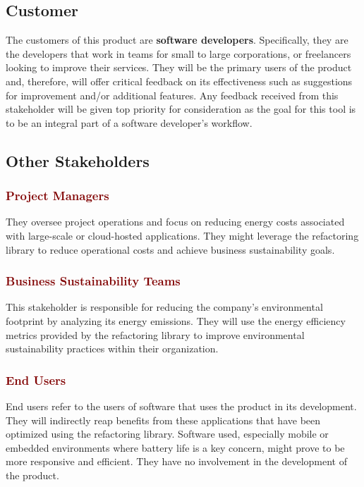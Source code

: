 \documentclass[12pt]{article}
\begin{document}
\subsection{Customer}
The customers of this product are \textbf{software developers}.
Specifically, they are the developers that work in teams for small to
large corporations, or freelancers looking to improve their services.
They will be the primary users of the product and, therefore, will
offer critical feedback on its effectiveness such as suggestions for
improvement and/or additional features. Any feedback received from
this stakeholder will be given top priority for consideration as the
goal for this tool is to be an integral part of a software developer's workflow.

\subsection{Other Stakeholders}
\subsubsection*{\textcolor{Maroon}{Project Managers}}
They oversee project operations and focus on reducing energy costs
associated with large-scale or cloud-hosted applications. They might
leverage the refactoring library to reduce operational costs and
achieve business sustainability goals.

\subsubsection*{\textcolor{Maroon}{Business Sustainability Teams}}
This stakeholder is responsible for reducing the company's
environmental footprint by analyzing its energy emissions. They will
use the energy efficiency metrics provided by the refactoring library
to improve environmental sustainability practices within their organization.

\subsubsection*{\textcolor{Maroon}{End Users}}
End users refer to the users of software that uses the product in its
development. They will indirectly reap benefits from these
applications that have been optimized using the refactoring library.
Software used, especially mobile or embedded environments where
battery life is a key concern, might prove to be more responsive and
efficient. They have no involvement in the development of the product.
\end{document}
